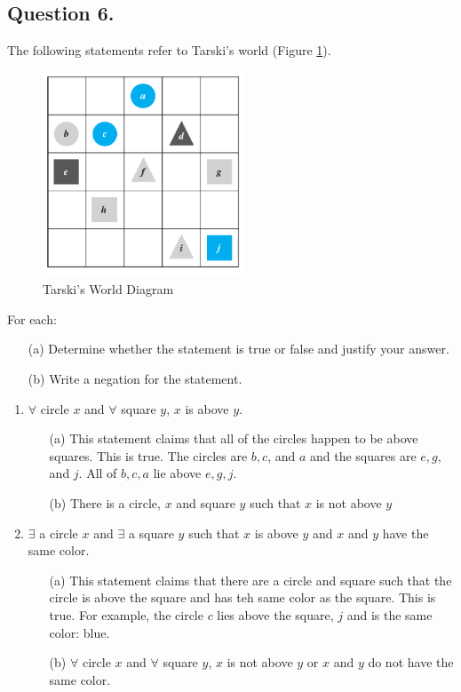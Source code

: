 \documentclass[12pt]{article}
\begin{document}
\subsection*{Question 6.}
The following statements refer to Tarski's world (Figure \ref{fig:Tarski}).
\begin{figure}[H]
	\centering
	\includegraphics[width=6cm]{tarski}
	\caption{Tarski's World Diagram}
	\label{fig:Tarski}
\end{figure}
For each:
\begin{enumerate}
	\item[(a)] Determine whether the statement is true or false and justify your answer.
	\item[(b)] Write a negation for the statement.
\end{enumerate}
\begin{enumerate}
	\item $\forall$ circle $x$ and $\forall$ square $y$, $x$ is above $y$.

	      \begin{enumerate}
		      \item[(a)] This statement claims that all of the circles happen to be above squares. This is true. The circles are \(b, c\), and \(a\) and the squares are \(e, g\), and \(j\). All of \(b, c, a\) lie above \(e, g, j\).

		      \item[(b)] There is a circle, \(x\) and square \(y\) such that \(x\) is not above \(y\)
	      \end{enumerate}

	\item $\exists$ a circle $x$ and $\exists$ a square $y$ such that $x$ is above $y$ and $x$ and $y$ have the same color.

	      \begin{enumerate}
		      \item[(a)]     This statement claims that there are a circle and square such that the circle is above the square and has teh same color as the square. This is true. For example, the circle \(c\) lies above the square, \(j\) and is the same color: blue.

		      \item[(b)] \(\forall\) circle \(x\) and \(\forall\) square $y$, $x$ is not above $y$ or $x$ and $y$ do not have the same color.
	      \end{enumerate}
\end{enumerate}
\end{document}
